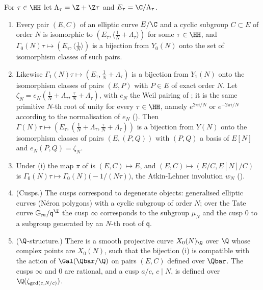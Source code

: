 \begin{theorem}\label{thm:modforms:moduli}
For $\tau\in\HH$ let $\Lambda_\tau=\Z+\Z\tau$ and $E_\tau=\C/\Lambda_\tau$.
\begin{enumerate}[label=(\roman*)]
\item Every pair $(E,C)$ of an elliptic curve $E/\C$ and a cyclic subgroup $C\subset E$ of order $N$ is isomorphic to $(E_\tau,\langle\frac1N+\Lambda_\tau\rangle)$ for some $\tau\in\HH$, and
$\Gamma_0(N)\tau\mapsto(E_\tau,\langle\frac1N\rangle)$ is a bijection from $Y_0(N)$ onto the set of isomorphism classes of such pairs.
\item Likewise $\Gamma_1(N)\tau\mapsto(E_\tau,\frac1N+\Lambda_\tau)$ is a bijection from $Y_1(N)$ onto the isomorphism classes of pairs $(E,P)$ with $P\in E$ of exact order $N$. Let
$\zeta_N=e_N(\frac1N+\Lambda_\tau,\frac\tau N+\Lambda_\tau)$, with $e_N$ the Weil pairing of ; it is the same primitive $N$-th root of unity for every $\tau\in\HH$, namely
$e^{2\pi i/N}$ or $e^{-2\pi i/N}$ according to the normalisation of $e_N$ (). Then $\Gamma(N)\tau\mapsto(E_\tau,(\frac1N+\Lambda_\tau,\frac\tau N+\Lambda_\tau))$ is a bijection from
$Y(N)$ onto the isomorphism classes of pairs $(E,(P,Q))$ with $(P,Q)$ a basis of $E[N]$ and $e_N(P,Q)=\zeta_N$.
\item Under (i) the map $\pi$ of  is $(E,C)\mapsto E$, and $(E,C)\mapsto(E/C,E[N]/C)$ is $\Gamma_0(N)\tau\mapsto\Gamma_0(N)\bigl(-1/(N\tau)\bigr)$, the
Atkin-Lehner involution $w_N$ ().
\item (Cusps.) The cusps correspond to degenerate objects: generalised elliptic curves (N\'eron polygons) with a cyclic subgroup of order $N$; over the Tate
curve $\mathbb G_m/\mathsf q^\Z$ the cusp $\infty$ corresponds to the subgroup $\mu_N$ and the cusp $0$ to a subgroup generated by an $N$-th root of $\mathsf q$.
\item ($\Q$-structure.) There is a smooth projective curve $X_0(N)_\Q$ over $\Q$ whose complex points are $X_0(N)$, such that the bijection (i) is compatible with the
action of $\Gal(\Qbar/\Q)$ on pairs $(E,C)$ defined over $\Qbar$. The cusps $\infty$ and $0$ are rational, and a cusp $a/c$, $c\mid N$, is defined over $\Q(\zeta_{\gcd(c,N/c)})$.
\end{enumerate}
\end{theorem}

